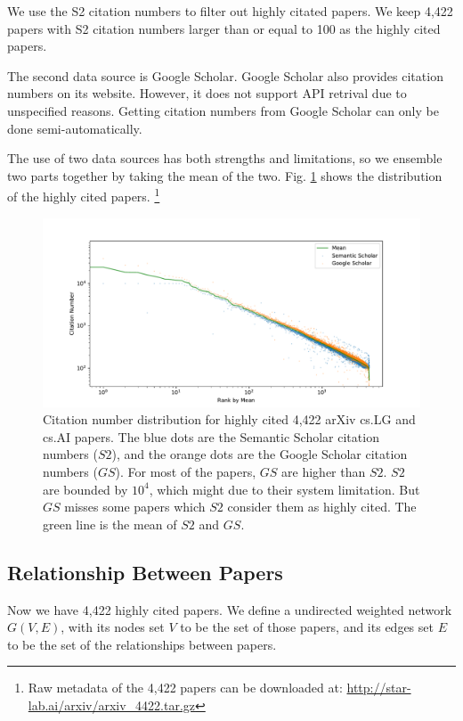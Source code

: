 We use the S2 citation numbers to filter out highly citated papers.
We keep 4,422 papers with S2 citation numbers larger than or equal to 100 as the highly cited papers.

The second data source is Google Scholar.
Google Scholar also provides citation numbers on its website.
However, it does not support API retrival due to unspecified reasons.
Getting citation numbers from Google Scholar can only be done semi-automatically.

The use of two data sources has both strengths and limitations,
so we ensemble two parts together by taking the mean of the two.
Fig. \ref{fig:distribution} shows the distribution of the highly cited papers.
\footnote{Raw metadata of the 4,422 papers can be downloaded at: \url{http://star-lab.ai/arxiv/arxiv_4422.tar.gz}}

\begin{figure}
    \centering
    \includegraphics[width=\textwidth]{images/citation_number_distribution.pdf}
    \caption{Citation number distribution for highly cited 4,422 arXiv cs.LG and cs.AI papers.
        The blue dots are the Semantic Scholar citation numbers ($S2$),
        and the orange dots are the Google Scholar citation numbers ($GS$).
        For most of the papers, $GS$ are higher than $S2$.
        $S2$ are bounded by $10^4$, which might due to their system limitation.
        But $GS$ misses some papers which $S2$ consider them as highly cited.
        The green line is the mean of $S2$ and $GS$.
    }
    \label{fig:distribution}
\end{figure}

\subsection{Relationship Between Papers}

Now we have 4,422 highly cited papers.
We define a undirected weighted network $G(V,E)$, with its nodes set $V$ to be the set of those papers, and its edges set $E$ to be the set of the relationships between papers.

